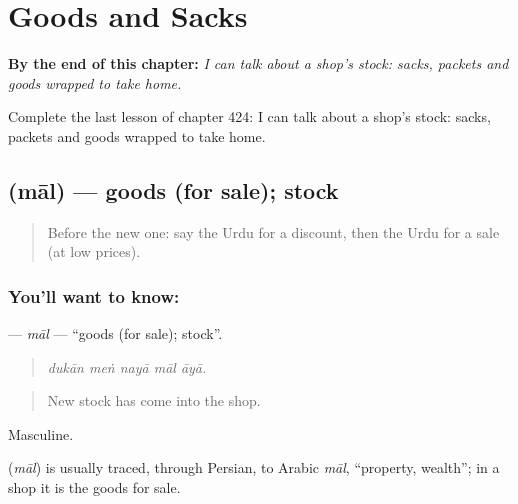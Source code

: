 
\chapter{Goods and Sacks}
\label{ch:ur-goods-and-sacks}

\begin{chapteropening}
\textbf{By the end of this chapter:} \emph{I can talk about a shop's stock: sacks, packets and goods wrapped to take home.}

Complete the last lesson of chapter 424: I can talk about a shop's stock: sacks, packets and goods wrapped to take home.
\end{chapteropening}

\section[\texorpdfstring{\ur{مال} (māl)}{مال (māl)}]{ (māl) — goods (for sale); stock}

\label{lesson:UR-C424-mal}



\begin{quote}
Before the new one: say the Urdu for a discount, then the Urdu for a sale (at low prices).
\end{quote}

\subsection*{You'll want to know: }
\textbf{} — \emph{māl} — \textquotedblleft{}goods (for sale); stock\textquotedblright{}.

\begin{quote}
    
\end{quote}

\begin{quote}
\emph{dukān meṅ nayā māl āyā.}
\end{quote}

\begin{quote}
New stock has come into the shop.
\end{quote}

Masculine.

\begin{cousinweb}
\textbf{} (\emph{māl}) is usually traced, through Persian, to Arabic \emph{māl}, \textquotedblleft{}property, wealth\textquotedblright{}; in a shop it is the goods for sale.
\end{cousinweb}

